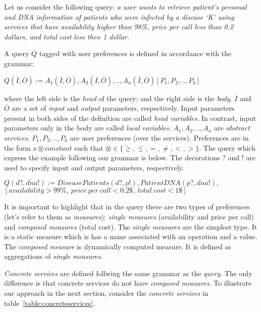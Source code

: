 Let us consider the following query: \textit{a user wants to retrieve patient's personal and DNA information of patients who were infected by a disease `K' using services that have availability higher than 98\%, price per call less than 0.2 dollars, and total cost less then 1 dollar.} 

A query $Q$ tagged with user preferences is defined in accordance with the grammar:
\begin{center}
$Q (\overline{I}, \overline{O}) := A_{1}(\overline{I}, \overline{O}), A_{2}(\overline{I}, \overline{O}), ..,  A_{n}(\overline{I}, \overline{O})[P_{1},P_{2}, .., P_{k}]$
\end{center}
where the left side is the \textit{head} of the query; and the right side is the \textit{body}. 
$\overline{I}$ and $\overline{O}$ are a set of \textit{input} and \textit{output} parameters, respectively.
Input parameters present in both sides of the definition are called \textit{head variables}.
In contrast, input parameters only in the body are called \textit{local variables}.
$A_{1}, A_{2}, .., A_{n}$ are \textit{abstract services}.
$P_{1}, P_{2}, .., P_{k}$ are user preferences (over the services). Preferences are in the form $x \otimes constant$ such that $\otimes \in\lbrace \geq, \leq, =, \neq, <, >\rbrace$.
The query which express the example following our grammar is below.
The decorations ? and ! are used to specify input and output parameters, respectively. 
\begin{small}
\begin{center}
$Q (d?, dna!) := DiseasePatients(d?, p!), PatientDNA(p?, dna!),$ \\
$[availability > 99\%, \ price \ per \ call < 0.2\$, \ total \ cost < 1\$]$
\end{center} 
\end{small}

It is important to highlight that in the query there are two types of preferences (let's refer to them as \textit{measures}): \textit{single measures} (availability and price per call) and \textit{composed measures} (total cost). 
The \textit{single measures} are the simplest type. It is a static measure which is has a name associated with an operation and a value. The\textit{ composed measure} is dynamically computed measure. It is defined as aggregations of \textit{single measures}. 

\textit{Concrete services} are defined follwing the same grammar as the \textit{query}. The only difference is that concrete services do not have \textit{composed measures}. 
To illustrate our approach in the next section, consider the \textit{concrete services} in table~\ref{table:concreteservices}.

